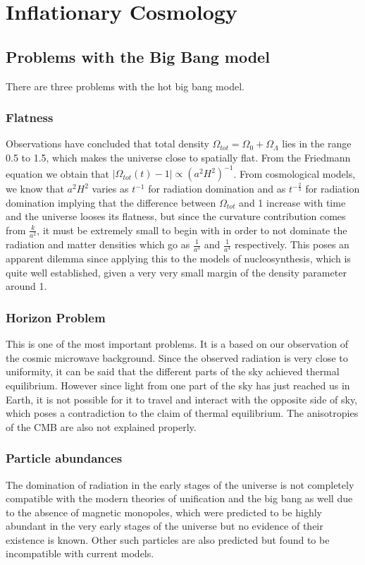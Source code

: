 \section{Inflationary Cosmology}
\subsection{Problems with the Big Bang model}
 There are three problems with the hot big bang model.
 \subsubsection{Flatness}
 Observations have concluded that total density $\Omega_{tot} = \Omega_0 + \Omega_{\Lambda}$ lies in the range 0.5 to 1.5, which makes the universe close to spatially flat. From the Friedmann equation we obtain that $|{\Omega_{tot}(t)-1}| \propto (a^2H^2)^{-1}$. From cosmological models, we know that $a^2H^2$ varies as $t^{-1}$ for radiation domination and as $t^{-\frac{2}{3}}$ for radiation domination implying that the difference between $\Omega_{tot}$ and 1 increase with time and the universe looses its flatness, but since the curvature contribution comes from $\frac{k}{a^2}$, it must be extremely small to begin with in order to not dominate the radiation and matter densities which go as $\frac{1}{a^3}$ and $\frac{1}{a^4}$ respectively. This poses an apparent dilemma since applying this to the models of nucleosynthesis, which is quite well established, given a very very small margin of the density parameter around 1.
 \subsubsection{Horizon Problem}
 This is one of the most important problems. It is a based on our observation of the cosmic microwave background. Since the observed radiation is very close to uniformity, it can be said that the different parts of the sky achieved thermal equilibrium. However since light from one part of the sky has just reached us in Earth, it is not possible for it to travel and interact with the opposite side of sky, which poses a contradiction to the claim of thermal equilibrium. The anisotropies of the CMB are also not explained properly.
 \subsubsection{ Particle abundances}
 The domination of radiation in the early stages of the universe is not completely compatible with the modern theories of unification and the big bang as well due to the absence of magnetic monopoles, which were predicted to be highly abundant in the very early stages of the universe but no evidence of their existence is known. Other such particles are also predicted but found to be incompatible with current models.
 
